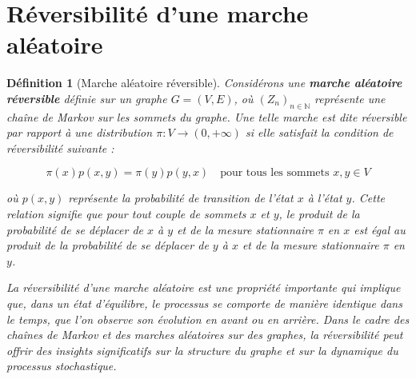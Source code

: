 \documentclass{article}
\theoremstyle{pasdepoint}
\newtheorem{definition}{Définition}
\theoremstyle{break}
\theoremstyle{pasdepoint}
\begin{document}
\section{Réversibilité d'une marche aléatoire}

\begin{definition}[Marche aléatoire réversible]
    Considérons une \textbf{marche aléatoire réversible} définie sur un graphe $G = (V, E)$, où $(Z_n)_{n \in \mathbb{N}}$ représente une chaîne de Markov sur les sommets du graphe. Une telle marche est dite réversible par rapport à une distribution $\pi : V \rightarrow (0, +\infty)$ si elle satisfait la condition de réversibilité suivante :

\[
\pi(x)p(x, y) = \pi(y)p(y, x) \quad \text{pour tous les sommets } x, y \in V
\]

où $p(x, y)$ représente la probabilité de transition de l'état $x$ à l'état $y$. Cette relation signifie que pour tout couple de sommets $x$ et $y$, le produit de la probabilité de se déplacer de $x$ à $y$ et de la mesure stationnaire $\pi$ en $x$ est égal au produit de la probabilité de se déplacer de $y$ à $x$ et de la mesure stationnaire $\pi$ en $y$.

La réversibilité d'une marche aléatoire est une propriété importante qui implique que, dans un état d'équilibre, le processus se comporte de manière identique dans le temps, que l'on observe son évolution en avant ou en arrière. Dans le cadre des chaînes de Markov et des marches aléatoires sur des graphes, la réversibilité peut offrir des insights significatifs sur la structure du graphe et sur la dynamique du processus stochastique.

\end{definition}
\end{document}
